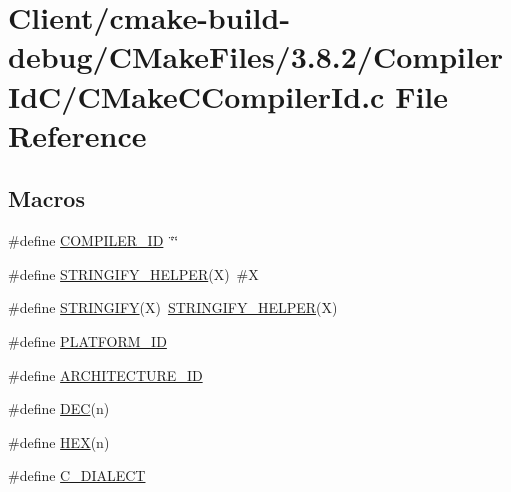 \hypertarget{Client_2cmake-build-debug_2CMakeFiles_23_88_82_2CompilerIdC_2CMakeCCompilerId_8c}{}\section{Client/cmake-\/build-\/debug/\+C\+Make\+Files/3.8.2/\+Compiler\+Id\+C/\+C\+Make\+C\+Compiler\+Id.c File Reference}
\label{Client_2cmake-build-debug_2CMakeFiles_23_88_82_2CompilerIdC_2CMakeCCompilerId_8c}
\subsection*{Macros}
\begin{DoxyCompactItemize}
\item 
\#define \mbox{\hyperlink{Client_2cmake-build-debug_2CMakeFiles_23_88_82_2CompilerIdC_2CMakeCCompilerId_8c_a81dee0709ded976b2e0319239f72d174}{C\+O\+M\+P\+I\+L\+E\+R\+\_\+\+ID}}~\char`\"{}\char`\"{}
\item 
\#define \mbox{\hyperlink{Client_2cmake-build-debug_2CMakeFiles_23_88_82_2CompilerIdC_2CMakeCCompilerId_8c_a2ae9b72bb13abaabfcf2ee0ba7d3fa1d}{S\+T\+R\+I\+N\+G\+I\+F\+Y\+\_\+\+H\+E\+L\+P\+ER}}(X)~\#X
\item 
\#define \mbox{\hyperlink{Client_2cmake-build-debug_2CMakeFiles_23_88_82_2CompilerIdC_2CMakeCCompilerId_8c_a43e1cad902b6477bec893cb6430bd6c8}{S\+T\+R\+I\+N\+G\+I\+FY}}(X)~\mbox{\hyperlink{Server_2cmake-build-debug_2CMakeFiles_23_88_82_2CompilerIdCXX_2CMakeCXXCompilerId_8cpp_a2ae9b72bb13abaabfcf2ee0ba7d3fa1d}{S\+T\+R\+I\+N\+G\+I\+F\+Y\+\_\+\+H\+E\+L\+P\+ER}}(X)
\item 
\#define \mbox{\hyperlink{Client_2cmake-build-debug_2CMakeFiles_23_88_82_2CompilerIdC_2CMakeCCompilerId_8c_adbc5372f40838899018fadbc89bd588b}{P\+L\+A\+T\+F\+O\+R\+M\+\_\+\+ID}}
\item 
\#define \mbox{\hyperlink{Client_2cmake-build-debug_2CMakeFiles_23_88_82_2CompilerIdC_2CMakeCCompilerId_8c_aba35d0d200deaeb06aee95ca297acb28}{A\+R\+C\+H\+I\+T\+E\+C\+T\+U\+R\+E\+\_\+\+ID}}
\item 
\#define \mbox{\hyperlink{Client_2cmake-build-debug_2CMakeFiles_23_88_82_2CompilerIdC_2CMakeCCompilerId_8c_ad1280362da42492bbc11aa78cbf776ad}{D\+EC}}(n)
\item 
\#define \mbox{\hyperlink{Client_2cmake-build-debug_2CMakeFiles_23_88_82_2CompilerIdC_2CMakeCCompilerId_8c_a46d5d95daa1bef867bd0179594310ed5}{H\+EX}}(n)
\item 
\#define \mbox{\hyperlink{Client_2cmake-build-debug_2CMakeFiles_23_88_82_2CompilerIdC_2CMakeCCompilerId_8c_a07f8e5783674099cd7f5110e22a78cdb}{C\+\_\+\+D\+I\+A\+L\+E\+CT}}
\end{DoxyCompactItemize}
